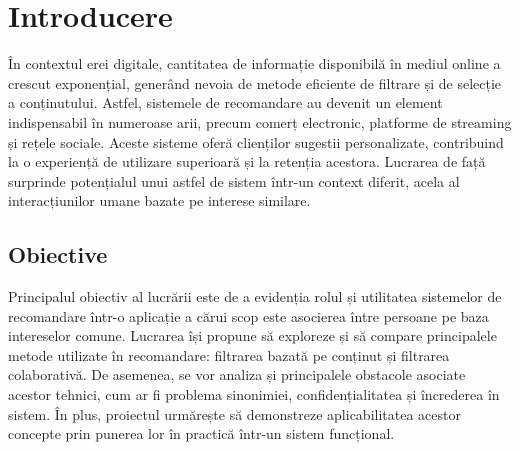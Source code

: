 \chapter{Introducere}
\label{intro}
În contextul erei digitale, cantitatea de informație disponibilă în mediul online a crescut exponențial, generând nevoia de metode eficiente de filtrare și de selecție a conținutului.
Astfel, sistemele de recomandare au devenit un element indispensabil în numeroase arii, precum comerț electronic, platforme de streaming și rețele sociale.
Aceste sisteme oferă clienților sugestii personalizate, contribuind la o experiență de utilizare superioară și la retenția acestora.
Lucrarea de față surprinde potențialul unui astfel de sistem într-un context diferit, acela al interacțiunilor umane bazate pe interese similare.


\section{Obiective}
\label{section:ch1sec1}
Principalul obiectiv al lucrării este de a evidenția rolul și utilitatea sistemelor de recomandare într-o aplicație a cărui scop este asocierea între persoane pe baza intereselor comune.
Lucrarea își propune să exploreze și să compare principalele metode utilizate în recomandare: filtrarea bazată pe conținut și filtrarea colaborativă.
De asemenea, se vor analiza și principalele obstacole asociate acestor tehnici, cum ar fi problema sinonimiei, confidențialitatea și încrederea în sistem.
În plus, proiectul urmărește să demonstreze aplicabilitatea acestor concepte prin punerea lor în practică într-un sistem funcțional.


